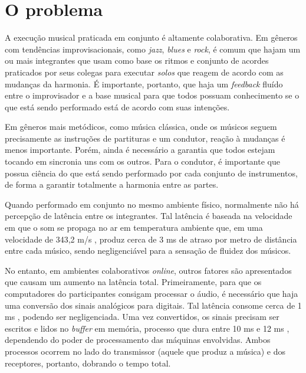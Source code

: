 \section{O problema}


A execução musical praticada em conjunto é altamente colaborativa. Em gêneros com tendências improvisacionais, como \textit{jazz}, \textit{blues} e \textit{rock}, é comum que hajam um ou mais integrantes que usam como base os ritmos e conjunto de acordes praticados por seus colegas para executar \textit{solos} que reagem de acordo com as mudanças da harmonia. É importante, portanto, que haja um \textit{feedback} fluído entre o improvisador e a base musical para que todos possuam conhecimento se o que está sendo performado está de acordo com suas intenções.

Em gêneros mais metódicos, como música clássica, onde os músicos seguem precisamente as instruções de partituras e um condutor, reação à mudanças é menos importante. Porém, ainda é necessário a garantia que todos estejam tocando em sincronia uns com os outros. Para o condutor, é importante que possua ciência do que está sendo performado por cada conjunto de instrumentos, de forma a garantir totalmente a harmonia entre as partes.

Quando performado em conjunto no mesmo ambiente físico, normalmente não há percepção de latência entre os integrantes. Tal latência é baseada na velocidade em que o som se propaga no ar em temperatura ambiente que, em uma velocidade de 343,2 m/s \cite{speed_of_sound}, produz cerca de 3 ms de atraso por metro de distância entre cada músico, sendo negligenciável para a sensação de fluidez dos músicos.

No entanto, em ambientes colaborativos \textit{online}, outros fatores são apresentados que causam um aumento na latência total. Primeiramente, para que os computadores do participantes consigam processar o áudio, é necessário que haja uma conversão dos sinais analógicos para digitais. Tal latência consome cerca de 1 ms \cite{how_low_can_you_go}, podendo ser negligenciada. Uma vez convertidos, os sinais precisam ser escritos e lidos no \textit{buffer} em memória, processo que dura entre 10 ms e 12 ms \cite{how_low_can_you_go}, dependendo do poder de processamento das máquinas envolvidas. Ambos processos ocorrem no lado do transmissor (aquele que produz a música) e dos receptores, portanto, dobrando o tempo total.

